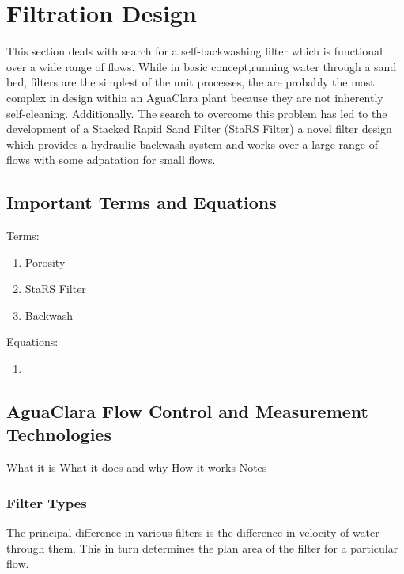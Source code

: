\documentclass[letterpaper,10pt,english]{sphinxmanual}
\begin{document}
\chapter{Filtration Design}
\label{\detokenize{Filtration/Filtration_Design:filtration-design}}\label{\detokenize{Filtration/Filtration_Design:title-filtration}}\label{\detokenize{Filtration/Filtration_Design::doc}}
This section deals with search for a self-backwashing filter which is functional over a wide range of flows. While in basic concept,running water through a sand bed, filters are the simplest of the unit processes, the are probably the most complex in design within an AguaClara plant because they are not inherently self-cleaning. Additionally. The search to overcome this problem has led to the development of a Stacked Rapid Sand Filter (StaRS Filter) a novel filter design which provides a hydraulic backwash system and works over a large range of flows with some adpatation for small flows.


\section{Important Terms and Equations}
\label{\detokenize{Filtration/Filtration_Design:important-terms-and-equations}}\label{\detokenize{Filtration/Filtration_Design:heading-filtration-terms}}
Terms:
\begin{enumerate}
\item {} 
Porosity

\item {} 
StaRS Filter

\item {} 
Backwash

\end{enumerate}

Equations:
\begin{enumerate}
\item {} 
\end{enumerate}


\section{AguaClara Flow Control and Measurement Technologies}
\label{\detokenize{Filtration/Filtration_Design:aguaclara-flow-control-and-measurement-technologies}}\label{\detokenize{Filtration/Filtration_Design:heading-aguaclara-filtration-technologies}}
What it is
What it does and why
How it works
Notes


\subsection{Filter Types}
\label{\detokenize{Filtration/Filtration_Design:filter-types}}\label{\detokenize{Filtration/Filtration_Design:heading-filter-types}}
The principal difference in various filters is the difference in velocity of water through them. This in turn determines the plan area of the filter for a particular flow.
\end{document}
